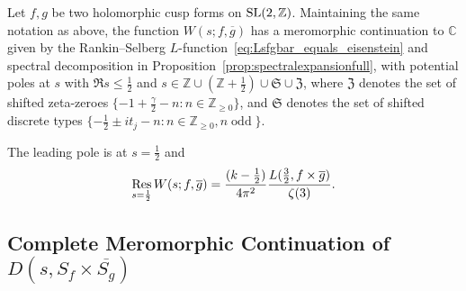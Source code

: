 \begin{theorem}\label{thm:Wsfgmero}
  Let $f,g$ be two holomorphic cusp forms on $\operatorname{SL}(2, \mathbb{Z})$.
  Maintaining the same notation as above, the function $W(s; f,\overline{g})$ has a
  meromorphic continuation to $\mathbb{C}$ given by the Rankin--Selberg %
  $L$-function~\eqref{eq:Lsfgbar_equals_eisenstein}
  and spectral decomposition in Proposition~\ref{prop:spectralexpansionfull},
  with potential poles at $s$ with $\Re s \leq \tfrac{1}{2}$ and $s \in
  \mathbb{Z}\cup(\mathbb{Z} + \tfrac{1}{2})\cup\mathfrak{S}\cup\mathfrak{Z}$, where
  $\mathfrak{Z}$ denotes the set of shifted zeta-zeroes $\{-1 + \frac{\gamma}{2} - n: n
  \in \mathbb{Z}_{\geq 0}\}$, and $\mathfrak{S}$ denotes the set of shifted discrete types
  $\{-\tfrac{1}{2} \pm it_j - n: n \in \mathbb{Z}_{\geq 0}, n \; \text{odd}\; \}$.

  The leading pole is at $s = \frac{1}{2}$ and
    \begin{equation}
      \operatorname*{Res}_{s = \frac{1}{2}} W(s; f, \overline{g}) = \frac{(k - \frac{1}{2})}{4\pi^2}
      \frac{L(\tfrac{3}{2}, f\times \overline{g})}{\zeta(3)}.
    \end{equation}
\end{theorem}



\subsection{Complete Meromorphic Continuation of $D(s, S_f\times \overline{S_{g}})$}


